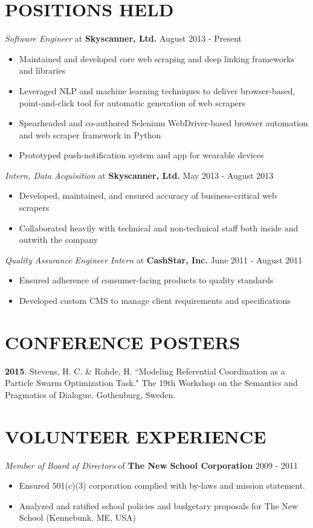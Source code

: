 \documentclass[line, margin]{res}
\begin{document}
\begin{resume}
\section{POSITIONS HELD}
\textit{Software Engineer} at \textbf{Skyscanner, Ltd.} \hfill August 2013 - Present
\begin{itemize}[leftmargin=10pt]
\item Maintained and developed core web scraping and deep linking frameworks and libraries
\item Leveraged NLP and machine learning techniques to deliver browser-based, point-and-click tool for automatic generation of web scrapers
\item Spearheaded and co-authored Selenium WebDriver-based browser automation and web scraper framework in Python
\item Prototyped push-notification system and app for wearable devices
\end{itemize}
\textit{Intern, Data Acquisition} at \textbf{Skyscanner, Ltd.} \hfill May 2013 - August 2013
\begin{itemize}[leftmargin=10pt]
\item Developed, maintained, and ensured accuracy of business-critical web scrapers
\item Collaborated heavily with technical and non-technical staff both inside and outwith the company
\end{itemize}
\textit{Quality Assurance Engineer Intern} at \textbf{CashStar, Inc.} \hfill June 2011 - August 2011
\begin{itemize}[leftmargin=10pt]
\item Ensured adherence of consumer-facing products to quality standards
\item Developed custom CMS to manage client requirements and specifications
\end{itemize}

\section{CONFERENCE POSTERS}
\textbf{2015}. Stevens, H. C. \& Rohde, H. ``Modeling Referential Coordination as a Particle Swarm Optimization Task." The 19th Workshop on the Semantics and Pragmatics of Dialogue. Gothenburg, Sweden.

\section{VOLUNTEER EXPERIENCE}
\textit{Member of Board of Directors} of \textbf{The New School Corporation} \hfill 2009 - 2011
\begin{itemize}[leftmargin=10pt]
\item Ensured 501(c)(3) corporation complied with by-laws and mission statement.
\item Analyzed and ratified school policies and budgetary proposals for The New School (Kennebunk, ME, USA)
\end{itemize}


\end{resume}
\end{document}
